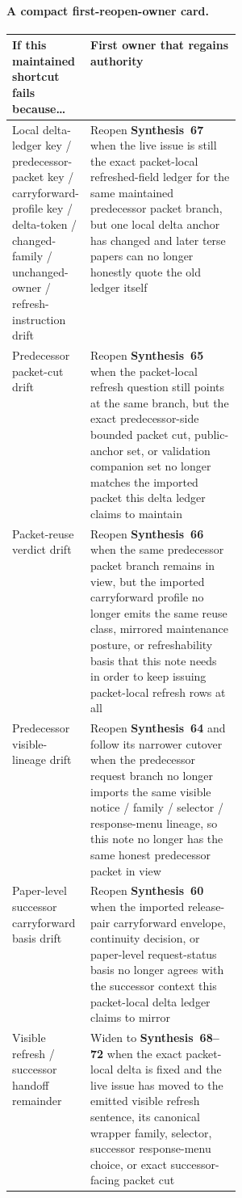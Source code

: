 \documentclass[11pt]{article}
\begin{document}
\paragraph{A compact first-reopen-owner card.}
\begin{table}[t]
\centering
\footnotesize
\begin{tabularx}{0.98\linewidth}{@{}p{0.33\linewidth}X@{}}
\toprule
If this maintained shortcut fails because\ldots & First owner that regains authority \\
\midrule
Local delta-ledger key / predecessor-packet key / carryforward-profile key / delta-token / changed-family / unchanged-owner / refresh-instruction drift & Reopen \textbf{Synthesis~67} when the live issue is still the exact packet-local refreshed-field ledger for the same maintained predecessor packet branch, but one local delta anchor has changed and later terse papers can no longer honestly quote the old ledger itself \\
Predecessor packet-cut drift & Reopen \textbf{Synthesis~65} when the packet-local refresh question still points at the same branch, but the exact predecessor-side bounded packet cut, public-anchor set, or validation companion set no longer matches the imported packet this delta ledger claims to maintain \\
Packet-reuse verdict drift & Reopen \textbf{Synthesis~66} when the same predecessor packet branch remains in view, but the imported carryforward profile no longer emits the same reuse class, mirrored maintenance posture, or refreshability basis that this note needs in order to keep issuing packet-local refresh rows at all \\
Predecessor visible-lineage drift & Reopen \textbf{Synthesis~64} and follow its narrower cutover when the predecessor request branch no longer imports the same visible notice / family / selector / response-menu lineage, so this note no longer has the same honest predecessor packet in view \\
Paper-level successor carryforward basis drift & Reopen \textbf{Synthesis~60} when the imported release-pair carryforward envelope, continuity decision, or paper-level request-status basis no longer agrees with the successor context this packet-local delta ledger claims to mirror \\
Visible refresh / successor handoff remainder & Widen to \textbf{Synthesis~68--72} when the exact packet-local delta is fixed and the live issue has moved to the emitted visible refresh sentence, its canonical wrapper family, selector, successor response-menu choice, or exact successor-facing packet cut \\

\end{tabularx}
\end{table}
\end{document}
